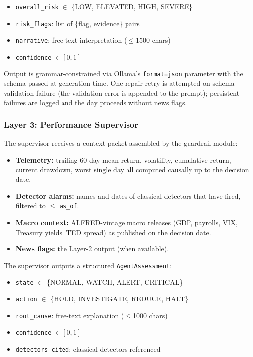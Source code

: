 \documentclass[11pt,a4paper]{article}
\begin{document}
  \begin{itemize}
    \item \texttt{overall\_risk} $\in$ \{LOW, ELEVATED, HIGH, SEVERE\}
    \item \texttt{risk\_flags}: list of \{flag, evidence\} pairs
    \item \texttt{narrative}: free-text interpretation ($\leq$1500 chars)
    \item \texttt{confidence} $\in [0,1]$
  \end{itemize}

  \noindent Output is grammar-constrained via Ollama's \texttt{format=json}
  parameter with the schema passed at generation time. One repair retry is
  attempted on schema-validation failure (the validation error is appended to the
  prompt); persistent failures are logged and the day proceeds without news flags.

  \subsubsection{Layer 3: Performance Supervisor}\label{sec:supervisor}

  The supervisor receives a context packet assembled by the guardrail module:

  \begin{itemize}
    \item \textbf{Telemetry:} trailing 60-day mean return, volatility, cumulative
          return, current drawdown, worst single day all computed causally up to
          the decision date.
    \item \textbf{Detector alarms:} names and dates of classical detectors that
          have fired, filtered to $\leq$ \texttt{as\_of}.
    \item \textbf{Macro context:} ALFRED-vintage macro releases (GDP, payrolls,
          VIX, Treasury yields, TED spread) as published on the decision date.
    \item \textbf{News flags:} the Layer-2 output (when available).
  \end{itemize}

  \noindent The supervisor outputs a structured \texttt{AgentAssessment}:

  \begin{itemize}
    \item \texttt{state} $\in$ \{NORMAL, WATCH, ALERT, CRITICAL\}
    \item \texttt{action} $\in$ \{HOLD, INVESTIGATE, REDUCE, HALT\}
    \item \texttt{root\_cause}: free-text explanation ($\leq$1000 chars)
    \item \texttt{confidence} $\in [0,1]$
    \item \texttt{detectors\_cited}: classical detectors referenced
  \end{itemize}
\end{document}
